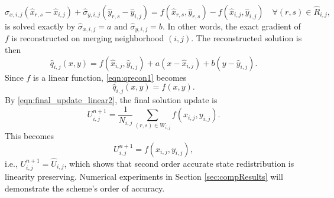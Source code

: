 \begin{equation}
\widehat{\sigma}_{x,i,j}(\widehat{x}_{r,s} - \widehat{x}_{i,j}) + \widehat{\sigma}_{y,i,j}(\widehat{y}_{r,s} - \widehat{y}_{i,j})= f(\widehat{x}_{r,s}, \widehat{y}_{r,s}) - f(\widehat{x}_{i,j}, \widehat{y}_{i,j}) \quad \forall (r,s) \in \widehat{R}_{i,j},
\end{equation}
is solved exactly by $\widehat{\sigma}_{x,i,j}=a$ and
$\widehat{\sigma}_{y,i,j}=b$.  In other words, the exact gradient 
of $f$ is reconstructed on merging neighborhood $(i,j)$.  
The reconstructed solution is then
\begin{equation}
    \label{eqn:qrecon1}
    \hat{q}_{i,j}(x,y) = f(\widehat{x}_{i,j},\widehat{y}_{i,j}) + a(x-\widehat{x}_{i,j})+b(y-\widehat{y}_{i,j}) .
\end{equation}
Since $f$ is a linear function, \eqref{eqn:qrecon1} becomes
\begin{equation}
    \label{eqn:qrecon2}
    \hat{q}_{i,j}(x,y) = f(x,y).
\end{equation}
By \eqref{eqn:final_update_linear2}, the final solution update is
\begin{equation} 
U^{n+1}_{i,j} = \frac{1}{N_{i,j}}\sum_{(r,s) \in W_{i,j}}f(x_{i,j},y_{i,j}).
\end{equation}
This becomes
\begin{equation} 
U^{n+1}_{i,j} = f(x_{i,j},y_{i,j}),
\end{equation}
i.e., $U^{n+1}_{i,j} = \widehat{U}_{i,j}$, which shows that second order accurate state redistribution is linearity preserving. Numerical experiments in Section \ref{sec:compResults} will demonstrate the scheme's order of accuracy.






